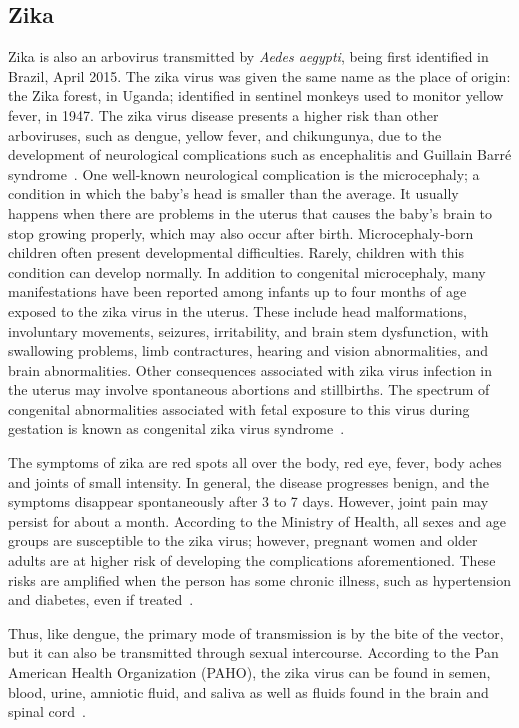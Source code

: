 \subsection{Zika}
%
Zika is also an arbovirus transmitted by {\it Aedes aegypti}, being first identified in Brazil, April 2015.
The zika virus was given the same name as the place of origin: the Zika forest, in Uganda; identified in sentinel monkeys used to monitor yellow fever, in 1947.
The zika virus disease presents a higher risk than other arboviruses, such as dengue, yellow fever, and chikungunya, due to the development of neurological complications such as encephalitis and Guillain Barré syndrome~\cite{petersen2016zika}.
One well-known neurological complication is the microcephaly; a condition in which the baby's head is smaller than the average.
It usually happens when there are problems in the uterus that causes the baby's brain to stop growing properly, which may also occur after birth.
Microcephaly-born children often present developmental difficulties.
Rarely, children with this condition can develop normally. In addition to congenital microcephaly, many manifestations have been reported among infants up to four months of age exposed to the zika virus in the uterus.
These include head malformations, involuntary movements, seizures, irritability, and brain stem dysfunction, with swallowing problems, limb contractures, hearing and vision abnormalities, and brain abnormalities.
Other consequences associated with zika virus infection in the uterus may involve spontaneous abortions and stillbirths. The spectrum of congenital abnormalities associated with fetal exposure to this virus during gestation is known as congenital zika virus syndrome~\cite{web:who2016zika}.

The symptoms of zika are red spots all over the body, red eye, fever, body aches and joints of small intensity.
In general, the disease progresses benign, and the symptoms disappear spontaneously after 3 to 7 days.
However, joint pain may persist for about a month.
According to the Ministry of Health, all sexes and age groups are susceptible to the zika virus; however, pregnant women and older adults are at higher risk of developing the complications aforementioned.
These risks are amplified when the person has some chronic illness, such as hypertension and diabetes, even if treated~\cite{PAHO2017zika}.

Thus, like dengue, the primary mode of transmission is by the bite of the vector, but it can also be transmitted through sexual intercourse.
According to the Pan American Health Organization (PAHO),
the zika virus can be found in semen, blood, urine, amniotic fluid, and saliva as well as fluids found in the brain and spinal cord~\cite{PAHO2017zika}.

